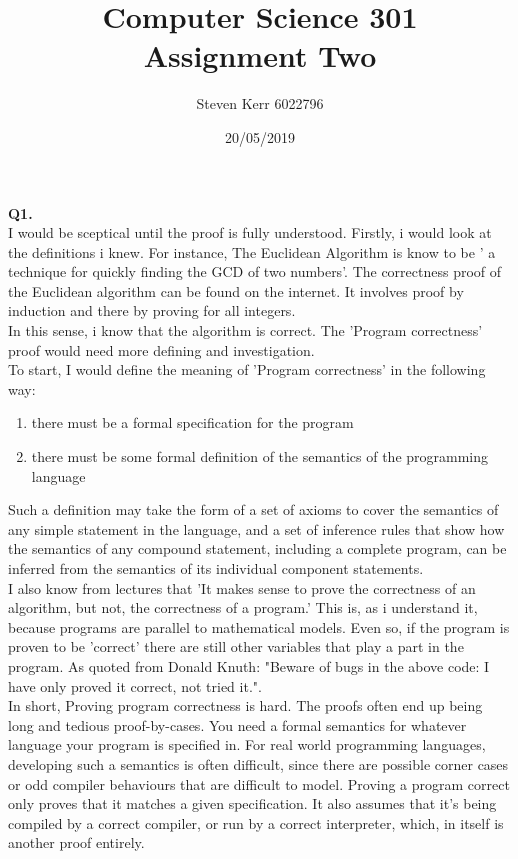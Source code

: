 \documentclass[a4paper,12pt]{article}
\title{Computer Science 301 \\
\large Assignment Two}
\author{Steven Kerr 6022796}
\date{20/05/2019}
\begin{document}
\maketitle

\noindent \textbf{Q1.} \\
I would be sceptical until the proof is fully understood. Firstly, i would look at the definitions i knew. For instance, The Euclidean Algorithm is know to be ' a technique for quickly finding the GCD of two numbers'. The correctness proof of the Euclidean algorithm  can be found on the internet. It involves proof by induction and there by proving for all integers. \\ 
In this sense, i know that the algorithm is correct. The 'Program correctness' proof would need more defining and investigation. \\
To start, I would define the meaning of 'Program correctness' in the following way:
\begin{enumerate}
\item there must be a formal specification for the program
\item there must be some formal definition of the semantics of the programming language
\end{enumerate}
Such a definition may take the form of a set of axioms to cover the semantics of any simple statement in the language, and a set of inference rules that show how the semantics of any compound statement, including a complete program, can be inferred from the semantics of its individual component statements. \\
I also know from lectures that 'It makes sense to prove the correctness of an algorithm, but not, the correctness of a program.' This is, as i understand it, because programs are parallel to mathematical models. Even so, if the program is proven to be 'correct' there are still other variables that play a part in the program. As quoted from Donald Knuth: "Beware of bugs in the above code: I have only proved it correct, not tried it.". \\
In short, Proving program correctness is hard. The proofs often end up being long and tedious proof-by-cases. You need a formal semantics for whatever language your program is specified in. For real world programming languages, developing such a semantics is often difficult, since there are possible corner cases or odd compiler behaviours that are difficult to model. Proving a program correct only proves that it matches a given specification. It also assumes that it's being compiled by a correct compiler, or run by a correct interpreter, which, in itself is another proof entirely. \\
\end{document}
